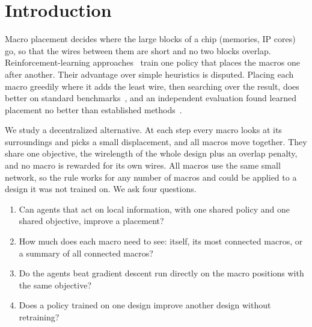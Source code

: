 \documentclass[10pt]{article}
\begin{document}
\section{Introduction}

Macro placement decides where the large blocks of a chip (memories, IP cores) go, so that the wires between them are short and no two blocks overlap. Reinforcement-learning approaches~\citep{mirhoseini2021graph,lai2022maskplace,lai2023chipformer} train one policy that places the macros one after another. Their advantage over simple heuristics is disputed. Placing each macro greedily where it adds the least wire, then searching over the result, does better on standard benchmarks~\citep{shi2023wiremask}, and an independent evaluation found learned placement no better than established methods~\citep{cheng2023assessment}.

We study a decentralized alternative. At each step every macro looks at its surroundings and picks a small displacement, and all macros move together. They share one objective, the wirelength of the whole design plus an overlap penalty, and no macro is rewarded for its own wires. All macros use the same small network, so the rule works for any number of macros and could be applied to a design it was not trained on. We ask four questions.

\begin{enumerate}[label=\textbf{Q\arabic*},leftmargin=2.4em]
\item Can agents that act on local information, with one shared policy and one shared objective, improve a placement?
\item How much does each macro need to see: itself, its most connected macros, or a summary of all connected macros?
\item Do the agents beat gradient descent run directly on the macro positions with the same objective?
\item Does a policy trained on one design improve another design without retraining?
\end{enumerate}
\end{document}
